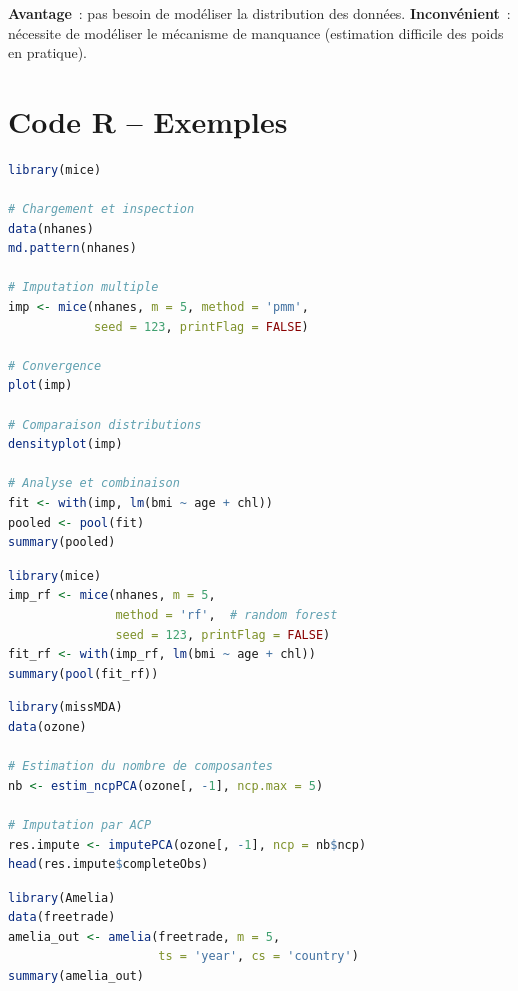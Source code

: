 \documentclass[a4paper,11pt]{article}
\theoremstyle{definition}
\theoremstyle{remark}
\begin{document}
\textbf{Avantage}~: pas besoin de modéliser la distribution des données.
\textbf{Inconvénient}~: nécessite de modéliser le mécanisme de manquance
(estimation difficile des poids en pratique).

\section{Code R -- Exemples}

\begin{lstlisting}[language=R, caption=Imputation multiple avec mice]
library(mice)

# Chargement et inspection
data(nhanes)
md.pattern(nhanes)

# Imputation multiple
imp <- mice(nhanes, m = 5, method = 'pmm',
            seed = 123, printFlag = FALSE)

# Convergence
plot(imp)

# Comparaison distributions
densityplot(imp)

# Analyse et combinaison
fit <- with(imp, lm(bmi ~ age + chl))
pooled <- pool(fit)
summary(pooled)
\end{lstlisting}

\begin{lstlisting}[language=R, caption=Imputation par forêts aléatoires (randomForest)]
library(mice)
imp_rf <- mice(nhanes, m = 5,
               method = 'rf',  # random forest
               seed = 123, printFlag = FALSE)
fit_rf <- with(imp_rf, lm(bmi ~ age + chl))
summary(pool(fit_rf))
\end{lstlisting}

\begin{lstlisting}[language=R, caption=Imputation par analyse factorielle (missMDA)]
library(missMDA)
data(ozone)

# Estimation du nombre de composantes
nb <- estim_ncpPCA(ozone[, -1], ncp.max = 5)

# Imputation par ACP
res.impute <- imputePCA(ozone[, -1], ncp = nb$ncp)
head(res.impute$completeObs)
\end{lstlisting}

\begin{lstlisting}[language=R, caption=Imputation avec Amelia (modèle gaussien)]
library(Amelia)
data(freetrade)
amelia_out <- amelia(freetrade, m = 5,
                     ts = 'year', cs = 'country')
summary(amelia_out)
\end{lstlisting}
\end{document}
